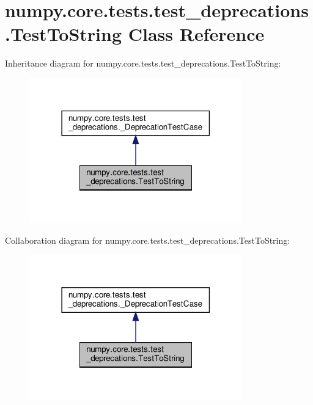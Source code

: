 \hypertarget{classnumpy_1_1core_1_1tests_1_1test__deprecations_1_1TestToString}{}\section{numpy.\+core.\+tests.\+test\+\_\+deprecations.\+Test\+To\+String Class Reference}
\label{classnumpy_1_1core_1_1tests_1_1test__deprecations_1_1TestToString}


Inheritance diagram for numpy.\+core.\+tests.\+test\+\_\+deprecations.\+Test\+To\+String\+:
\nopagebreak
\begin{figure}[H]
\begin{center}
\leavevmode
\includegraphics[width=261pt]{classnumpy_1_1core_1_1tests_1_1test__deprecations_1_1TestToString__inherit__graph}
\end{center}
\end{figure}


Collaboration diagram for numpy.\+core.\+tests.\+test\+\_\+deprecations.\+Test\+To\+String\+:
\nopagebreak
\begin{figure}[H]
\begin{center}
\leavevmode
\includegraphics[width=261pt]{classnumpy_1_1core_1_1tests_1_1test__deprecations_1_1TestToString__coll__graph}
\end{center}
\end{figure}
